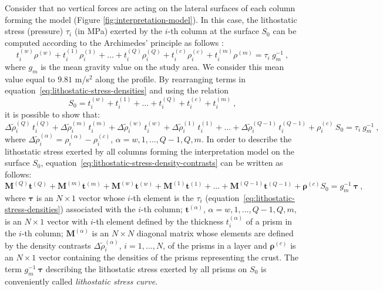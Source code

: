 \documentclass[manuscript]{geophysics}
\begin{document}
Consider that no vertical forces are acting on the lateral surfaces of 
each column forming the model (Figure \ref{fig:interpretation-model}). In this case, 
the lithostatic stress (pressure) $\tau_{i}$ (in MPa) exerted by the $i$-th column at 
the surface $S_{0}$ can be computed according to the Archimedes' principle as follows
\citep[][ p. 129]{turcotte-schubert2002}:
\begin{equation}
t^{(w)}_{i} \rho^{(w)} + t^{(1)}_{i} \rho^{(1)}_{i} + \dots + 
t^{(Q)}_{i} \rho^{(Q)}_{i} + t^{(c)}_{i} \rho^{(c)}_{i} + t^{(m)}_{i} \rho^{(m)} 
= \tau_{i} \: g_{m}^{-1} \: ,
\label{eq:lithostatic-stress-densities}
\end{equation}
where $g_{m}$ is the mean gravity value on the study area. 
We consider this mean value equal to $9.81$ m/s$^{2}$ along the profile.
By rearranging terms in equation~\ref{eq:lithostatic-stress-densities} 
and using the relation
\begin{equation}
S_{0} = t^{(w)}_{i} + t^{(1)}_{i} + \dots + t^{(Q)}_{i} + t^{(c)}_{i} + t^{(m)}_{i} \: ,
\label{eq:S0}
\end{equation}
it is possible to show that:
\begin{equation}
\Delta \tilde{\rho}^{(Q)}_{i} \, t^{(Q)}_{i} + 
\Delta \tilde{\rho}^{(m)}_{i} \, t^{(m)}_{i} + 
\Delta \tilde{\rho}^{(w)}_{i} \, t^{(w)}_{i} + 
\Delta \tilde{\rho}^{(1)}_{i} \, t^{(1)}_{i} +
\dots + 
\Delta \tilde{\rho}^{(Q-1)}_{i} \, t^{(Q-1)}_{i} +
\rho^{(c)}_{i} \, S_{0} = \tau_{i} \: g_{m}^{-1} \: ,
\label{eq:lithostatic-stress-density-contrasts}
\end{equation}
where $\Delta \tilde{\rho}^{(\alpha)}_{i} = \rho^{(\alpha)}_{i} - \rho^{(c)}_{i}$, 
$\alpha = w, 1, \dots, Q-1, Q, m$.
In order to describe the lithostatic stress exerted by all columns forming the
interpretation model on the surface $S_{0}$, 
equation~\ref{eq:lithostatic-stress-density-contrasts} 
can be written as follows:
\begin{equation}
\mathbf{M}^{(Q)} \mathbf{t}^{(Q)} + \mathbf{M}^{(m)} \mathbf{t}^{(m)} + \mathbf{M}^{(w)}
\mathbf{t}^{(w)} + \mathbf{M}^{(1)} \mathbf{t}^{(1)} + \dots + \mathbf{M}^{(Q-1)}
\mathbf{t}^{(Q-1)} + \boldsymbol{\rho}^{(c)} S_{0} = g_{m}^{-1} \: \boldsymbol{\tau} \: ,
\label{eq:lithostatic-stress-matrix}
\end{equation}
where $\boldsymbol{\tau}$ is an $N \times 1$ vector whose $i$-th element is
the $\tau_{i}$ (equation~\ref{eq:lithostatic-stress-densities}) associated with
the $i$-th column; $\mathbf{t}^{(\alpha)}$, $\alpha = w, 1, \dots, Q-1, Q, m$, 
is an $N \times 1$ vector with $i$-th element defined by the thickness 
$t^{(\alpha)}_{i}$ of a prism in the $i$-th column; $\mathbf{M}^{(\alpha)}$ is an $N \times N$ diagonal 
matrix whose elements are defined by the density contrasts 
$\Delta \tilde{\rho}^{(\alpha)}_{i}$, $i = 1, \dots, N$, of the prisms in a layer and
$\boldsymbol{\rho}^{(c)}$ is an $N \times 1$ vector containing the densities of the prisms
representing the crust. The term $g_{m}^{-1} \: \boldsymbol{\tau}$ describing the
lithostatic stress exerted by all prisms on $S_{0}$ is conveniently called
\textit{lithostatic stress curve}.
\end{document}
